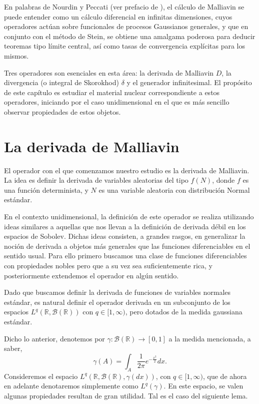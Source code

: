 \documentclass[letterpaper,twoside,12pt]{book}
\newcommand{\R}{\mathbb{R}}
\newcommand{\B}{\mathcal{B}}
\newcommand{\1}{\mathds{1}}
\renewcommand{\to}{\rightarrow}
\theoremstyle{definition}
\theoremstyle{definition}
\theoremstyle{definition}
\theoremstyle{definition}
\theoremstyle{definition}
\theoremstyle{definition}
\theoremstyle{definition}
\begin{document}
En palabras de Nourdin y Peccati (ver prefacio de \cite{Nourdin_Peccati_2012}), el cálculo de Malliavin se puede entender como un cálculo diferencial en infinitas dimensiones, cuyos operadores actúan sobre funcionales de procesos Gaussianos generales, y que en conjunto con el método de Stein, se obtiene una amalgama poderosa para deducir teoremas tipo límite central, así como tasas de convergencia explícitas para los mismos. 

Tres operadores son esenciales en esta área: la derivada de Malliavin $D$, la divergencia (o integral de Skorokhod) $\delta$ y el generador infinitesimal. El propósito de este capítulo es estudiar el material nuclear correspondiente a estos operadores, iniciando por el caso unidimensional en el que es más sencillo observar propiedades de estos objetos.

\section{La derivada de Malliavin}

El operador con el que comenzamos nuestro estudio es la derivada de Malliavin. La idea es definir la derivada de variables aleatorias del tipo $f(N)$, donde $f$ es una función determinista, y $N$ es una variable aleatoria con distribución Normal estándar.

En el contexto unidimensional, la definición de este operador se realiza utilizando ideas similares a aquellas que nos llevan a la definición de derivada débil en los espacios de Sobolev. Dichas ideas consisten, a grandes rasgos, en generalizar la noción de derivada a objetos más generales que las funciones diferenciables en el sentido usual. Para ello primero buscamos una clase de funciones diferenciables con propiedades nobles pero que a su vez sea suficientemente rica, y posteriormente extendemos el operador en algún sentido.

Dado que buscamos definir la derivada de funciones de variables normales estándar, es natural definir el operador derivada en un subconjunto de los espacios $L^q(\R,\B(\R))$ con $q\in [1,\infty)$, pero dotados de la medida gaussiana estándar. 

Dicho lo anterior, denotemos por $\gamma:\B(\R)\to [0,1]$ a la medida mencionada, a saber, 
\[
\gamma(A)=\int_A\frac{1}{2\pi}e^{-\frac{x^2}{2}}dx.    
\]
Consideremos el espacio $L^{q}(\R,\B(\R),\gamma(dx))$, con $q\in [1,\infty)$, que de ahora en adelante denotaremos simplemente como $L^{q}(\gamma)$. En este espacio, se valen algunas propiedades resultan de gran utilidad. Tal es el caso del siguiente lema.
\end{document}

